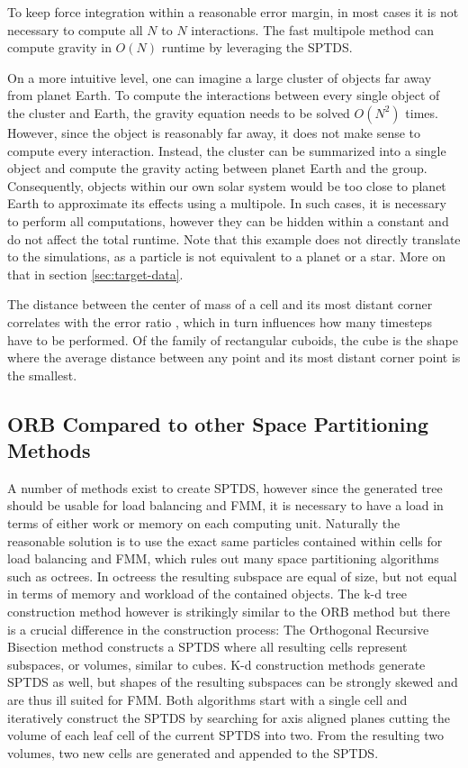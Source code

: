 \documentclass[]{article}
\begin{document}
To keep force integration within a reasonable error margin, in most cases it is not necessary to compute all $N$ to $N$ interactions. The fast multipole method can compute gravity in $O(N)$ runtime by leveraging the SPTDS. \cite{Stadel2001}

On a more intuitive level, one can imagine a large cluster of objects far away from planet Earth. To compute the interactions between every single object of the cluster and Earth, the gravity equation needs to be solved $O(N^2)$ times. However, since the object is reasonably far away, it does not make sense to compute every interaction. Instead, the cluster can be summarized into a single object and compute the gravity acting between planet Earth and the group. Consequently, objects within our own solar system would be too close to planet Earth to approximate its effects using a multipole. In such cases, it is necessary to perform all computations, however they can be hidden within a constant and do not affect the total runtime. 
Note that this example does not directly translate to the simulations, as a particle is not equivalent to a planet or a star. More on that in section \ref{sec:target-data}.

The distance between the center of mass of a cell and its most distant corner correlates with the error ratio \cite{Stadel2001}, which in turn influences how many timesteps have to be performed. Of the family of rectangular cuboids, the cube is the shape where the average distance between any point and its most distant corner point is the smallest. 

\subsection{ORB Compared to other Space Partitioning Methods}

A number of methods exist to create SPTDS, however since the generated tree should be usable for load balancing and FMM, it is necessary to have a load in terms of either work or memory on each computing unit. Naturally the reasonable solution is to use the exact same particles contained within cells for load balancing and FMM, which rules out many space partitioning algorithms such as octrees. In octreess the resulting subspace are equal of size, but not equal in terms of memory and workload of the contained objects. The k-d tree construction method however is strikingly similar to the ORB method but there is a crucial difference in the construction process: The Orthogonal Recursive Bisection method constructs a SPTDS where all resulting cells represent subspaces, or volumes, similar to cubes. K-d construction methods generate SPTDS as well, but shapes of the resulting subspaces can be strongly skewed and are thus ill suited for FMM. Both algorithms start with a single cell and iteratively construct the SPTDS by searching for axis aligned planes cutting the volume of each leaf cell of the current SPTDS into two. From the resulting two volumes, two new cells are generated and appended to the SPTDS. 
\end{document}
